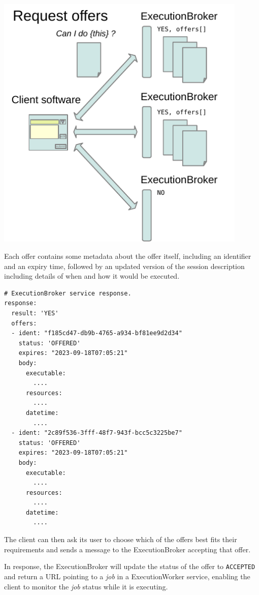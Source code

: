 \documentclass[11pt,a4paper]{ivoa}
\newcommand{\execbrokerclass} {ExecutionBroker}
\newcommand{\execworkerclass} {ExecutionWorker}
\newcommand{\codeword}[1] {\texttt{#1}}
\newcommand{\workerjob} {\textit{job}}
\begin{document}

\includegraphics[width=0.9\textwidth]{diagrams/request-offers.pdf}

Each offer contains some metadata about the offer itself,
including an identifier and an expiry time,
followed by an updated version of the session description
including details of when and how it would be executed.

\begin{lstlisting}[]
# ExecutionBroker service response.
response:
  result: 'YES'
  offers:
  - ident: "f185cd47-db9b-4765-a934-bf81ee9d2d34"
    status: 'OFFERED'
    expires: "2023-09-18T07:05:21"
    body:
      executable:
        ....
      resources:
        ....
      datetime:
        ....
  - ident: "2c89f536-3fff-48f7-943f-bcc5c3225be7"
    status: 'OFFERED'
    expires: "2023-09-18T07:05:21"
    body:
      executable:
        ....
      resources:
        ....
      datetime:
        ....
\end{lstlisting}

The client can then ask its user to choose which of the offers best fits their requirements
and sends a message to the \execbrokerclass{} accepting that offer.

In response, the \execbrokerclass{} will update the status of the offer to \codeword{ACCEPTED} and return a URL
pointing to a \workerjob{} in a \execworkerclass{} service, enabling the client to monitor the \workerjob{}
status while it is executing.
\end{document}
